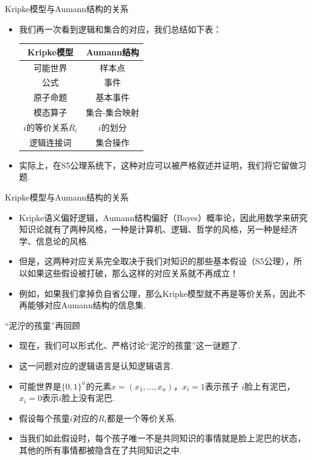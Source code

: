 \begin{frame}{Kripke模型与Aumann结构的关系}
\begin{itemize}
    \item 我们再一次看到逻辑和集合的对应，我们总结如下表：
    \begin{table}[ht]
        \centering
        \begin{tabular}{cc}
        \toprule
             Kripke模型&Aumann结构  \\\midrule
             可能世界&样本点\\
             公式&事件\\
             原子命题&基本事件\\
             模态算子&集合-集合映射\\
             $i$的等价关系$R_i$&$i$的划分\\
             逻辑连接词&集合操作\\\bottomrule
        \end{tabular}
    \end{table}
    \item 实际上，在S5公理系统下，这种对应可以被严格叙述并证明，我们将它留做习题. 
\end{itemize}
\end{frame}

\begin{frame}{Kripke模型与Aumann结构的关系}
\begin{itemize}
    \item Kripke语义偏好逻辑，Aumann结构偏好（Bayes）概率论，因此用数学来研究知识论就有了两种风格，一种是计算机、逻辑、哲学的风格，另一种是经济学、信息论的风格.
    \item 但是，这两种对应关系完全取决于我们对知识的那些基本假设（S5公理），所以如果这些假设被打破，那么这样的对应关系就不再成立！
    \item 例如，如果我们拿掉负自省公理，那么Kripke模型就不再是等价关系，因此不再能够对应Aumann结构的信息集.
\end{itemize}
\end{frame}

\begin{frame}{“泥泞的孩童”再回顾}
\begin{itemize}
    \item 现在，我们可以形式化、严格讨论“泥泞的孩童”这一谜题了.
    \item 这一问题对应的逻辑语言是认知逻辑语言.
    \item 可能世界是$\{0,1\}^n$的元素$x=(x_1,\dots,x_n)$，$x_i=1$表示孩子
    $i$脸上有泥巴，$x_i=0$表示$i$脸上没有泥巴.
    \item 假设每个孩童$i$对应的$R_i$都是一个等价关系.
    \item 当我们如此假设时，每个孩子唯一不是共同知识的事情就是脸上泥巴的状态，其他的所有事情都被隐含在了共同知识之中.
\end{itemize}
\end{frame}

